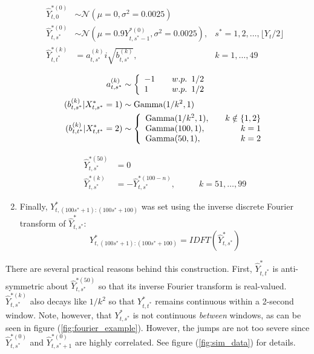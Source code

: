 \begin{enumerate}
	\begin{align*}
    	\hat{Y}^{*(0)}_{t,0} &\sim \mathcal{N} \left(\mu = 0, \sigma^2 = 0.0025 \right) & \\
    	\hat{Y}^{*(0)}_{t,s^*} &\sim \mathcal{N} \left(\mu = 0.9Y^{*(0)}_{t,s^*-1}, \sigma^2 = 0.0025 \right), & s^* = 1,2,\ldots, \lfloor Y_t/2 \rfloor \\
    	\hat{Y}^{*(k)}_{t,t^*} &= a_{t,s^*}^{(k)} i\sqrt{b^{(k)}_{t,s^*}}, & k = 1,\ldots,49 \\
	\end{align*}
	\begin{align*}
	    a_{t,s^*}^{(k)} &\sim  \left\{\begin{array}{lr}
    	-1 & \quad w.p. \enspace 1/2 \\
    	1  & \quad w.p. \enspace 1/2
    	\end{array}\right. \\
    	(b^{(k)}_{t,s^*}|X^*_{t,s^*}  = 1) &\sim {\rm{Gamma}}(1/k^2, 1) \\
    	(b^{(k)}_{t,t^*}|X^*_{t,t^*} = 2) &\sim \left\{\begin{array}{lr}
    	{\rm{Gamma}}(1/k^2, 1), \quad & k \notin \{1,2\} \\
    	{\rm{Gamma}}(100,1), & k = 1 \\
    	{\rm{Gamma}}(50,1), & k = 2
    	\end{array}\right. 
	\end{align*}

    \begin{align*}
        \hat{Y}^{*(50)}_{t,s^*} &= 0 & \\
    	\hat{Y}^{*(k)}_{t,s^*}  &= -\hat{Y}^{*(100-n)}_{t,s^*}, & \qquad k = 51,\ldots,99
    \end{align*}
	
	\item Finally, $Y^*_{t,(100s^*+1):(100s^*+100)}$ was set using the inverse discrete Fourier transform of $\hat{Y}^*_{t,s^*}$:
	$$Y^*_{t,(100s^*+1):(100s^*+100)} = IDFT\left(\hat{Y}^*_{t,s^*}\right)$$
		
\end{enumerate}

There are several practical reasons behind this construction. First, $\hat{Y}^*_{t,t^*}$ is anti-symmetric about $\hat{Y}^{*(50)}_{t,s^*}$ so that its inverse Fourier transform is real-valued. $\hat{Y}^{*(k)}_{t,s^*}$ also decays like $1/k^2$ so that $Y^*_{t,t^*}$ remains continuous within a 2-second window. Note, however, that $Y^*_{t,s^*}$ is not continuous \textit{between} windows, as can be seen in figure (\ref{fig:fourier_example}). However, the jumps are not too severe since $\hat{Y}^{*(0)}_{t,s^*}$ and $\hat{Y}^{*(0)}_{t,s^*+1}$ are highly correlated. See figure (\ref{fig:sim_data}) for details.

